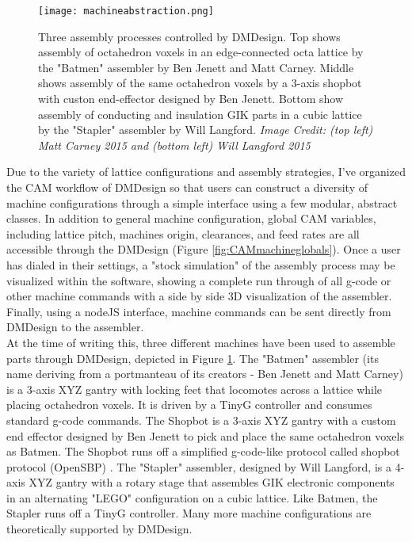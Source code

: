 {\begin{figure}
  \texttt{[image: machineabstraction.png]}
  \caption{Three assembly processes controlled by DMDesign.  Top shows assembly of octahedron voxels in an edge-connected octa lattice by the "Batmen" assembler by Ben Jenett and Matt Carney.  Middle shows assembly of the same octahedron voxels by a 3-axis shopbot with custon end-effector designed by Ben Jenett.  Bottom show assembly of conducting and insulation GIK parts in a cubic lattice by the "Stapler" assembler by Will Langford.  \textit{Image Credit: (top left) Matt Carney 2015 and (bottom left) Will Langford 2015}}
  \label{fig:machineabstraction}
\end{figure}

Due to the variety of lattice configurations and assembly strategies, I've organized the CAM workflow of DMDesign so that users can construct a diversity of machine configurations through a simple interface using a few modular, abstract classes.  In addition to general machine configuration, global CAM variables, including lattice pitch, machines origin, clearances, and feed rates are all accessible through the DMDesign (Figure \ref{fig:CAMmachineglobals}).  Once a user has dialed in their settings, a "stock simulation" of the assembly process may be visualized within the software, showing a complete run through of all g-code or other machine commands with a side by side 3D visualization of the assembler.  Finally, using a nodeJS interface, machine commands can be sent directly from DMDesign to the assembler.\\

At the time of writing this, three different machines have been used to assemble parts through DMDesign, depicted in Figure \ref{fig:machineabstraction}.  The "Batmen" assembler (its name deriving from a portmanteau of its creators - Ben Jenett and Matt Carney) is a 3-axis XYZ gantry with locking feet that locomotes across a lattice while placing octahedron voxels.  It is driven by a TinyG controller \cite{Synthetos2016} and consumes standard g-code commands.  The Shopbot is a 3-axis XYZ gantry with a custom end effector designed by Ben Jenett to pick and place the same octahedron voxels as Batmen.  The Shopbot runs off a simplified g-code-like protocol called shopbot protocol (OpenSBP) \cite{Shopbot2016}.  The "Stapler" assembler, designed by Will Langford, is a 4-axis XYZ gantry with a rotary stage that assembles GIK electronic components in an alternating "LEGO" configuration on a cubic lattice.  Like Batmen, the Stapler runs off a TinyG controller.  Many more machine configurations are theoretically supported by DMDesign.\\

}
